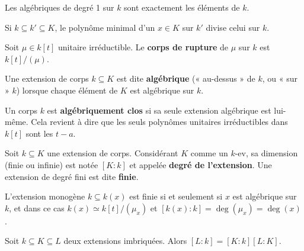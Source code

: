 	\begin{rem}
		Les algébriques de degré 1 sur $k$ sont exactement les éléments de $k$.
	\end{rem}
	
	\begin{rem}
		Si $k \subseteq k' \subseteq K$, le polynôme minimal d'un $x \in K$ sur $k'$ divise celui sur $k$.
	\end{rem}
	
	\begin{defn}
		Soit $\mu \in k[t]$ unitaire irréductible.
		Le \textbf{corps de rupture} de $\mu$ sur $k$ est $k[t]/(\mu)$.
	\end{defn}
	
	\begin{defn}
		Une extension de corps $k \subseteq K$ est dite \textbf{algébrique} (« au-dessus » de $k$, ou « sur » $k$) lorsque chaque élément de $K$ est algébrique sur $k$.
	\end{defn}
	
	\begin{defn}
		Un corps $k$ est \textbf{algébriquement clos} si sa seule extension algébrique est lui-même.
		Cela revient à dire que les seuls polynômes unitaires irréductibles dans  $k[t]$ sont les $t - a$.
	\end{defn}
	
	\begin{defn}
		Soit $k \subseteq K$ une extension de corps.
		Considérant $K$ comme un $k$-ev, sa dimension (finie ou infinie) est notée $[K:k]$ et appelée \textbf{degré de l'extension}.
		Une extension de degré fini est dite \textbf{finie}.
	\end{defn}
	
	\begin{pop}
		L'extension monogène $k \subseteq k(x)$ est finie si et seulement si $x$ est algébrique sur $k$, et dans ce cas $k(x) \simeq k[t]/(\mu_x)$ et $[k(x):k] = \deg(\mu_x) = \deg(x)$.
	\end{pop}
	
	\begin{pop}
		Soit $k \subseteq K \subseteq L$ deux extensions imbriquées.
		Alors $[L:k] = [K:k] [L:K]$.
	\end{pop}
	
